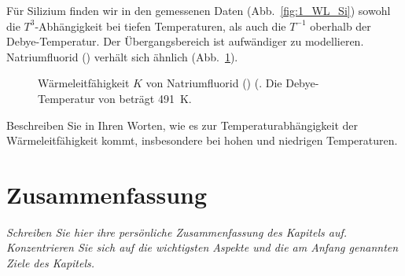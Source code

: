 Für Silizium finden wir in den gemessenen Daten (Abb.~\ref{fig:1_WL_Si}) sowohl die $T^3$-Abhängigkeit bei tiefen Temperaturen, als auch die $T^{-1}$ oberhalb der Debye-Temperatur. Der Übergangsbereich ist aufwändiger zu modellieren.  Natriumfluorid () verhält sich ähnlich (Abb.~\ref{fig:1_WL_NaF}).

\begin{figure}
    \caption{Wärmeleitfähigkeit $K$  von Natriumfluorid () (\cite{Jackson1970}. Die Debye-Temperatur von  beträgt 491~K.}
    \label{fig:1_WL_NaF}
\end{figure}



\begin{questions} 
\item Beschreiben Sie in Ihren Worten, wie es zur Temperaturabhängigkeit der Wärmeleitfähigkeit kommt, insbesondere bei hohen und niedrigen Temperaturen.
\end{questions}
 



\newpage
\section{Zusammenfassung}

\textit{Schreiben Sie hier ihre persönliche Zusammenfassung des Kapitels auf. Konzentrieren Sie sich auf die wichtigsten Aspekte und die am Anfang genannten Ziele des Kapitels.}

\vspace*{10cm}

\printbibliography[segment=\therefsegment,heading=subbibliography]
